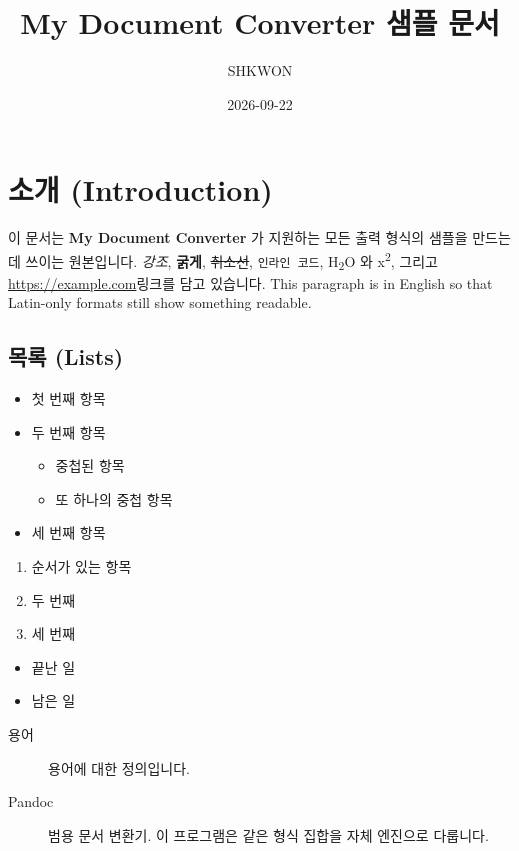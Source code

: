 \documentclass[11pt]{article}
\title{My Document Converter 샘플 문서}
\author{SHKWON}
\date{2026-09-22}
\begin{document}
\maketitle

\section*{소개 (Introduction)}\label{소개-introduction}

이 문서는 \textbf{My Document Converter} 가 지원하는 모든 출력 형식의 샘플을 만드는 데 쓰이는
원본입니다. \emph{강조}, \textbf{굵게}, \sout{취소선}, \verb|인라인 코드|,
H\textsubscript{2}O 와 x\textsuperscript{2}, 그리고
\url{https://example.com}링크를 담고 있습니다. This paragraph is in English so
that Latin-only formats still show something readable.

\subsection*{목록 (Lists)}\label{목록-lists}

\begin{itemize}
\item 첫 번째 항목
\item 두 번째 항목
\begin{itemize}
\item 중첩된 항목
\item 또 하나의 중첩 항목
\end{itemize}
\item 세 번째 항목
\end{itemize}

\begin{enumerate}
\item 순서가 있는 항목
\item 두 번째
\item 세 번째
\end{enumerate}

\begin{itemize}
\item 끝난 일
\item 남은 일
\end{itemize}

\begin{description}
\item[용어] 용어에 대한 정의입니다.
\item[Pandoc] 범용 문서 변환기. 이 프로그램은 같은 형식 집합을 자체 엔진으로 다룹니다.
\end{description}
\end{document}
